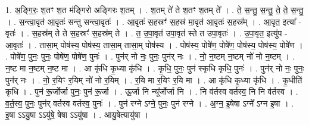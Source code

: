 \documentclass[17pt]{extarticle}
\begin{document}
1. अ॒ङ्गि॒रः॒ श॒तꣳ श॒त म॑ङ्गिरो अङ्गिरः श॒तम् । . श॒तम् ते॑ ते श॒तꣳ श॒तम् ते᳚ । . ते॒ स॒न्तु॒ स॒न्तु॒ ते॒ ते॒ स॒न्तु॒ । . स॒न्त्वा॒वृत॑ आ॒वृतः॑ सन्तु सन्त्वा॒वृतः॑ । . आ॒वृतः॑ स॒हस्रꣳ॑ स॒हस्र॑ मा॒वृत॑ आ॒वृतः॑ स॒हस्र᳚म् । . आ॒वृत॒ इत्या᳚ - वृतः॑ । . स॒हस्र॑म् ते ते स॒हस्रꣳ॑ स॒हस्र॑म् ते । . त॒ उ॒पा॒वृत॑ उपा॒वृत॑ स्ते त उपा॒वृतः॑ । . उ॒पा॒वृत॒ इत्यु॑प - आ॒वृतः॑ । . तासा॒म् पोष॑स्य॒ पोष॑स्य॒ तासा॒म् तासा॒म् पोष॑स्य । . पोष॑स्य॒ पोषे॑ण॒ पोषे॑ण॒ पोष॑स्य॒ पोष॑स्य॒ पोषे॑ण । . पोषे॑ण॒ पुनः॒ पुनः॒ पोषे॑ण॒ पोषे॑ण॒ पुनः॑ । . पुन॑र् नो नः॒ पुनः॒ पुन॑र् नः । . नो॒ न॒ष्टम् न॒ष्टम् नो॑ नो न॒ष्टम् । . न॒ष्ट मा न॒ष्टम् न॒ष्ट मा । . आ कृ॑धि कृ॒ध्या कृ॑धि । . कृ॒धि॒ पुनः॒ पुन॑ स्कृधि कृधि॒ पुनः॑ । . पुन॑र् नो नः॒ पुनः॒ पुन॑र् नः । . नो॒ र॒यिꣳ र॒यिम् नो॑ नो र॒यिम् । . र॒यि मा र॒यिꣳ र॒यि मा । . आ कृ॑धि कृ॒ध्या कृ॑धि । . कृ॒धीति॑ कृधि । . पुन॑ रू॒र्जोर्जा पुनः॒ पुन॑ रू॒र्जा । . ऊ॒र्जा नि न्यू᳚र्जोर्जा नि । . नि व॑र्तस्व वर्तस्व॒ नि नि व॑र्तस्व । . व॒र्त॒स्व॒ पुनः॒ पुन॑र् वर्तस्व वर्तस्व॒ पुनः॑ । . पुन॑ रग्ने ऽग्ने॒ पुनः॒ पुन॑ रग्ने । . अ॒ग्न॒ इ॒षेषा ऽग्ने᳚ ऽग्न इ॒षा । . इ॒षा ऽऽयु॒षा ऽऽयु॑षे॒ षेषा ऽऽयु॑षा । . आयु॒षेत्यायु॑षा । \newline
\end{document}
